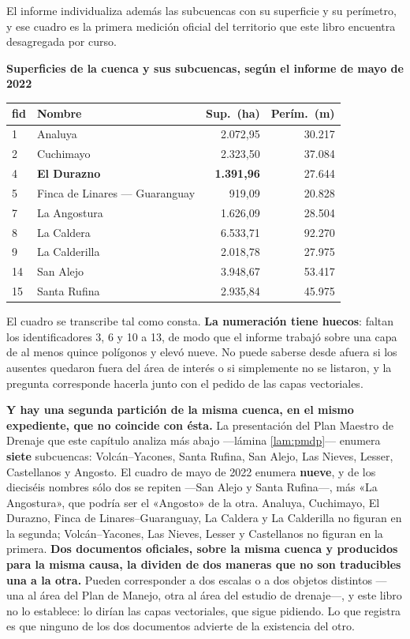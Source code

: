 El informe individualiza además las subcuencas con su superficie y su perímetro, y ese cuadro
es la primera medición oficial del territorio que este libro encuentra desagregada por curso.

{\sffamily\bfseries\footnotesize Superficies de la cuenca y sus subcuencas, según el informe de mayo de 2022\par}
\vspace{0.5em}
{\small
\setlength{\LTpre}{0.6em}\setlength{\LTpost}{1.2em}
\begin{longtable}{@{}p{0.9cm}p{6.4cm}r r@{}}
\toprule
\textbf{fid} & \textbf{Nombre} & \textbf{Sup.\ (ha)} & \textbf{Perím.\ (m)} \\
\midrule
\endhead
1 & Analuya & 2.072,95 & 30.217 \\
2 & Cuchimayo & 2.323,50 & 37.084 \\
4 & \textbf{El Durazno} & \textbf{1.391,96} & 27.644 \\
5 & Finca de Linares --- Guaranguay & 919,09 & 20.828 \\
7 & La Angostura & 1.626,09 & 28.504 \\
8 & La Caldera & 6.533,71 & 92.270 \\
9 & La Calderilla & 2.018,78 & 27.975 \\
14 & San Alejo & 3.948,67 & 53.417 \\
15 & Santa Rufina & 2.935,84 & 45.975 \\
\bottomrule
\end{longtable}
}

\begin{cautela}
El cuadro se transcribe tal como consta. \textbf{La numeración tiene huecos}: faltan los
identificadores 3, 6 y 10 a 13, de modo que el informe trabajó sobre una capa de al menos
quince polígonos y elevó nueve. No puede saberse desde afuera si los ausentes quedaron fuera
del área de interés o si simplemente no se listaron, y la pregunta corresponde hacerla junto
con el pedido de las capas vectoriales.

\textbf{Y hay una segunda partición de la misma cuenca, en el mismo expediente, que no coincide
con ésta.} La presentación del Plan Maestro de Drenaje que este capítulo analiza más abajo
---lámina \ref{lam:pmdp}--- enumera \textbf{siete} subcuencas: Volcán--Yacones, Santa Rufina,
San Alejo, Las Nieves, Lesser, Castellanos y Angosto. El cuadro de mayo de 2022 enumera
\textbf{nueve}, y de los dieciséis nombres sólo dos se repiten ---San Alejo y Santa Rufina---,
más «La Angostura», que podría ser el «Angosto» de la otra. Analuya, Cuchimayo, El Durazno,
Finca de Linares--Guaranguay, La Caldera y La Calderilla no figuran en la segunda; Volcán--Yacones,
Las Nieves, Lesser y Castellanos no figuran en la primera. \textbf{Dos documentos oficiales,
sobre la misma cuenca y producidos para la misma causa, la dividen de dos maneras que no
son traducibles una a la otra.} Pueden corresponder a dos escalas o a dos objetos distintos ---una
al área del Plan de Manejo, otra al área del estudio de drenaje---, y este libro no lo establece:
lo dirían las capas vectoriales, que sigue pidiendo. Lo que registra es que ninguno de los dos
documentos advierte de la existencia del otro.
\end{cautela}

